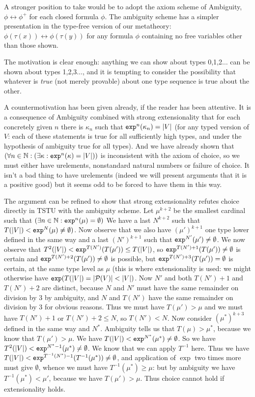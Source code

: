 \documentclass[12pt]{article}
\begin{document}
A stronger position to take would be to adopt the axiom scheme of Ambiguity, $\phi \leftrightarrow \phi^+$ for each closed formula $\phi$.  The ambiguity scheme has a simpler presentation in the type-free version of our metatheory:  $\phi(\tau(x)) \leftrightarrow \phi(\tau(y))$ for any formula $\phi$ containing no free variables other than those shown.

The motivation is clear enough:  anything we can show about types 0,1,2$\ldots$ can be shown about types 1,2,3$\ldots$, and it is tempting to consider the possibility that whatever is {\em true} (not merely provable) about one type sequence is true about the other.

A countermotivation has been given already, if the reader has been attentive.  It is a consequence of Ambiguity combined with strong extensionality that for each concretely given $n$ there is $\kappa_n$ such that ${\tt exp}^n(\kappa_n)=|V|$ (for any typed version of $V$:  each of these statements is true for all sufficiently high types, and under the hypothesis of ambiguity true for all types).  And we have already shown that $(\forall n \in {\mathbb N}:(\exists \kappa:{\tt exp}^n(\kappa) = |V|))$ is inconsistent with the axiom of choice, so we must either have urelements, nonstandard natural numbers or failure of choice.  It isn't a bad thing to have urelements (indeed we will present arguments that it is a positive good) but it seems odd to be forced to have them in this way.

The argument can be refined to show that strong extensionality refutes choice directly in TSTU with the ambiguity scheme.  Let $\mu^{k+2}$ be the smallest cardinal such that $(\exists n \in {\mathbb N}:{\tt exp}^n(\mu) =\emptyset)$  We have a last
$N^{k+2}$ such that $T(|V|)<{\tt exp}^N(\mu) \neq \emptyset)$.  Now observe that we also have $(\mu')^{k+1}$ one type lower defined in the same way and a last $(N')^{k+1}$ such that ${\tt exp}^{N'}(\mu') \neq \emptyset$.  We now observe that
$T^2(|V|)<{\tt exp}^{T(N')}(T(\mu')) \leq T(|V|)$, so ${\tt exp}^{T(N')+1}(T(\mu')) \neq \emptyset$ is certain and ${\tt exp}^{T(N')+2}(T(\mu')) \neq \emptyset$ is possible, but  ${\tt exp}^{T(N')+3}(T(\mu')) = \emptyset$ is certain, at the same type level as $\mu$  (this is where extensionality is used:  we might otherwise have ${\tt exp}(T(|V|) = |{\cal P}(V)| < |V|)$.  Now
$N'$ and both $T(N')+1$ and $T(N')+2$ are distinct, because $N$ and $N'$ must have the same remainder on division by 3 by ambiguity, and $N$ and $T(N')$ have the same remainder on division by 3 for obvious reasons.  Thus we must have $T(\mu') > \mu$ and we must have $T(N')+1$ or $T(N')+2  \leq N$, so $T(N')< N$.  Now consider
$(\mu^*)^{k+3}$ defined in the same way and $N^*$.  Ambiguity tells us that $T(\mu) > \mu^*$, because we know that $T(\mu')>\mu$.    We have $T(|V|)<{\tt exp}^{N^*}(\mu^*) \neq \emptyset$.
So we have $T^2(|V|)<{\tt exp}^{N^*-1}(\mu^*) \neq \emptyset$.  We know that we can apply $T^{-1}$ here.  Thus we have $T(|V|) < {\tt exp}^{T^{-1}(N^*)-1}(T^{-1}(\mu^*)) \neq \emptyset$, and application of $\exp$ two times more must give $\emptyset$, whence we must have $T^{-1}(\mu^*) \geq  \mu$:  but by ambiguity we have $T^{-1}(\mu^*)<\mu'$, because we have $T(\mu') > \mu$.  Thus choice cannot hold if extensionality holds.
\end{document}
